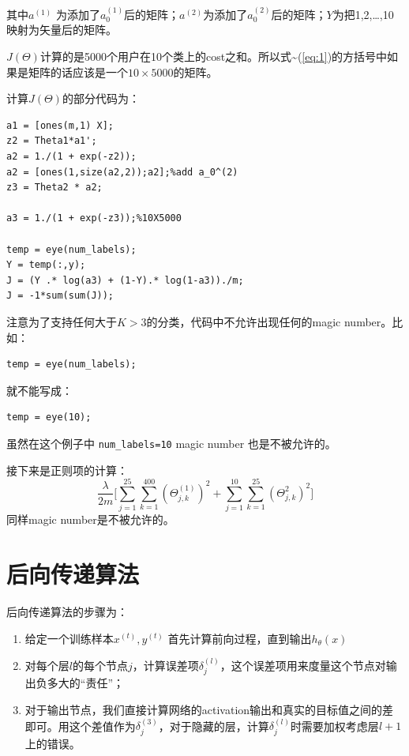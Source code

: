 \documentclass[10pt,a4paper,UTF8]{article}
\begin{document}
其中\(a^{(1)}\) 为添加了\(a_{0}^{(1)}\)后的矩阵；\(a^{(2)}\)为添加了\(a_{0}^{(2)}\)后的矩阵；\(Y\)为把1,2,\ldots{},10映射为矢量后的矩阵。


\(J(\Theta)\)计算的是5000个用户在10个类上的cost之和。所以式\textasciitilde{}(\ref{eq:1})的方括号中如果是矩阵的话应该是一个\(10\times 5000\)的矩阵。

计算\(J(\Theta)\)的部分代码为：
\lstset{language=matlab,label= ,caption= ,captionpos=b,numbers=none}
\begin{lstlisting}
a1 = [ones(m,1) X];
z2 = Theta1*a1';
a2 = 1./(1 + exp(-z2));
a2 = [ones(1,size(a2,2));a2];%add a_0^(2)
z3 = Theta2 * a2;

a3 = 1./(1 + exp(-z3));%10X5000

temp = eye(num_labels);
Y = temp(:,y);
J = (Y .* log(a3) + (1-Y).* log(1-a3))./m;
J = -1*sum(sum(J));
\end{lstlisting}
注意为了支持任何大于\(K>3\)的分类，代码中不允许出现任何的magic number。比如：
\lstset{language=matlab,label= ,caption= ,captionpos=b,numbers=none}
\begin{lstlisting}
temp = eye(num_labels);
\end{lstlisting}
就不能写成：
\lstset{language=matlab,label= ,caption= ,captionpos=b,numbers=none}
\begin{lstlisting}
temp = eye(10);
\end{lstlisting}
虽然在这个例子中 \texttt{num\_labels=10} magic number 也是不被允许的。

接下来是正则项的计算：
\begin{equation}
\label{eq:2}
\frac{\lambda}{2m} \big [ \sum_{j=1}^{25}\sum_{k=1}^{400} (\Theta_{j,k}^{(1)})^{2} + \sum_{j=1}^{10}\sum_{k=1}^{25}(\Theta_{j,k}^{2})^{2} \big]
\end{equation}
同样magic number是不被允许的。
\section{后向传递算法}
\label{sec:org63e4525}


后向传递算法的步骤为：
\begin{enumerate}
\item 给定一个训练样本\(x^{(t)},y^{(t)}\) 首先计算前向过程，直到输出\(h_{\theta}(x)\)
\item 对每个层\(l\)的每个节点\(j\)，计算误差项\(\delta_{j}^{(l)}\)，这个误差项用来度量这个节点对输出负多大的“责任”；
\item 对于输出节点，我们直接计算网络的activation输出和真实的目标值之间的差即可。用这个差值作为\(\delta_{j}^{(3)}\)，对于隐藏的层，计算\(\delta_{j}^{(l)}\)时需要加权考虑层\(l+1\)上的错误。
\end{enumerate}
\end{document}
